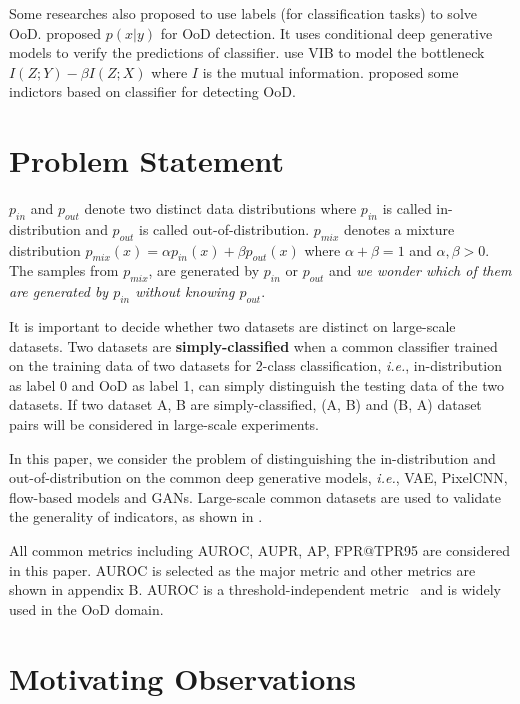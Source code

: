 \documentclass[letterpaper]{article} %
\newcommand{\IE}{\textit{i.e.}, }
\newcommand{\pin}{p_{in}}
\newcommand{\pout}{p_{out}}
\newcommand{\pmix}{p_{mix}}
\begin{document}
Some researches also proposed to use labels (for classification tasks) to solve OoD. 
\cite{che2019deep} proposed $p(x|y)$ for OoD detection. It uses conditional deep generative models to verify the predictions of classifier. \cite{alemi2018uncertainty} use VIB to model the bottleneck $I(Z;Y)-\beta I(Z;X)$ where $I$ is the mutual information. 
\cite{hendrycks2016baseline,hendrycks2018deep,hsu2020generalized,lee2018simple,lakshminarayanan2017simple} proposed some indictors based on classifier for detecting OoD. 

\section{Problem Statement}\label{sec2}

$\pin$ and $\pout$ denote two distinct data distributions where $\pin$ is called in-distribution and $\pout$ is called out-of-distribution. 
$\pmix$ denotes a mixture distribution $\pmix(x) = \alpha \pin(x) + \beta \pout(x)$ where $\alpha + \beta = 1$ and $\alpha, \beta > 0$. 
The samples from $\pmix$, are generated by $\pin$ or $\pout$ and \textit{we wonder which of them are generated by $\pin$ without knowing $\pout$}. 

It is important to decide whether two datasets are distinct on large-scale datasets. Two datasets are \textbf{simply-classified} when a common classifier trained on the training data of two datasets for 2-class classification, \IE in-distribution as label 0 and OoD as label 1, can simply distinguish the testing data of the two datasets. If two dataset A, B are simply-classified, (A, B) and (B, A) dataset pairs will be considered in large-scale experiments. 

In this paper, we consider the problem of distinguishing the in-distribution and out-of-distribution on the common deep generative models, \IE VAE, PixelCNN, flow-based models and GANs. Large-scale common datasets are used to validate the generality of indicators, as shown in . 

All common metrics including AUROC, AUPR, AP, FPR@TPR95 are considered in this paper. AUROC is selected as the major metric and other metrics are shown in appendix B. AUROC is a threshold-independent metric~\cite{davis2006relationship} and is widely used in the OoD domain. %

\section{Motivating Observations}\label{sec3}
\end{document}
